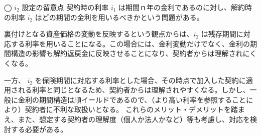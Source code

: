 \documentclass[report,gutter=10mm,fore-edge=10mm,uplatex,dvipdfmx]{jlreq}
\begin{document}
◯ $i_2$ 設定の留意点
契約時の利率 $i_1$ は期間ｎ年の金利であるのに対し、解約時の利率 $i_2$ はどの期間の金利を用いるべきかという問題がある。

裏付けとなる資産価格の変動を反映するという観点からは、$i_2$ は残存期間に対応する利率を用いることになる。この場合には、金利変動だけでなく、金利の期間構造の影響も解約返戻金に反映させることになり、契約者からは理解されにくくなる。

一方、 $i_2$ を保険期間に対応する利率とした場合、その時点で加入した契約に適用される利率と同じとなるため、契約者からは理解されやすくなる。しかし、一般に金利の期間構造は順イールドであるので、（より高い利率を参照することにより）契約者に不利な取扱いとなる。
これらのメリット・デメリットを踏まえ、また、想定する契約者の理解度（個人か法人かなど）等も考慮し、対応を検討する必要がある。
\end{document}
